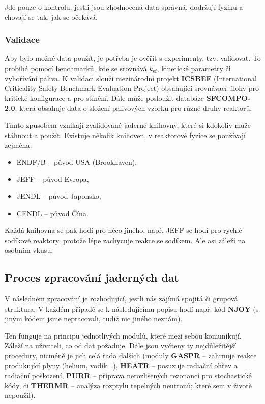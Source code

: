 Jde pouze o kontrolu, jestli jsou zhodnocená data správná, dodržují fyziku a chovají se tak, jak se očekává.

\subsubsection{Validace}

Aby bylo možné data použít, je potřeba je ověřit s experimenty, tzv. validovat. To probíhá pomocí benchmarků, kde se srovnává $k_\text{ef}$, kinetické parametry či vyhořívání paliva. K validaci slouží mezinárodní projekt \textbf{ICSBEF} (International Criticality Safety Benchmark Evaluation Project) obsahující srovnávací úlohy pro kritické konfigurace a pro stínění. Dále může posloužit databáze \textbf{SFCOMPO-2.0}, která obsahuje data o složení palivových vzorků pro různé druhy reaktorů.

Tímto způsobem vznikají zvalidované jaderné knihovny, které si kdokoliv může stáhnout a použít. Existuje několik knihoven, v reaktorové fyzice se používají zejména:

\begin{itemize}
  \item ENDF/B -- původ USA (Brookhaven),
  \item JEFF -- původ Evropa,
  \item JENDL -- původ Japonsko,
  \item CENDL -- původ Čína.
\end{itemize}

Každá knihovna se pak hodí pro něco jiného, např. JEFF se hodí pro rychlé sodíkové reaktory, protože lépe zachycuje reakce se sodíkem. Ale asi záleží na osobním vkusu.

\subsection{Proces zpracování jaderných dat}

V následném zpracování je rozhodující, jestli nás zajímá spojitá či grupová struktura. V každém případě se k následujícímu popisu hodí např. kód \textbf{NJOY} (s jiným kódem jsme nepracovali, tudíž nic jiného neznám).

Ten funguje na principu jednotlivých modulů, které mezi sebou komunikují. Záleží na uživateli, co od dat požaduje. Dále jsou vyčteny ty nejdůležitější procedury, nicméně je jich celá řada dalších (moduly \textbf{GASPR} -- zahrnuje reakce produkující plyny (helium, vodík...), \textbf{HEATR} -- posuzuje radiační ohřev a radiační poškození, \textbf{PURR} -- příprava nerozlišených rezonancí pro stochastické kódy, či \textbf{THERMR} -- analýza rozptylu tepelných neutronů; které sem v životě nepoužil).

